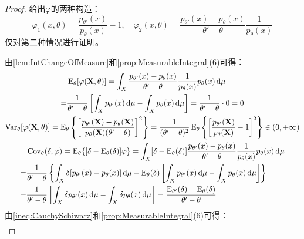\begin{proof}
	给出$\varphi$的两种构造：
	\begin{equation*}
		\varphi_1(x,\theta)=\frac{p_{\theta'}(x)}{p_{\theta}(x)}-1,\quad\varphi_2(x,\theta)=\frac{p_{\theta'}(x)-p_{\theta}(x)}{\theta'-\theta}\frac{1}{p_{\theta}(x)}
	\end{equation*}
	仅对第二种情况进行证明。\par
	由\cref{lem:IntChangeOfMeasure}和\cref{prop:MeasurableIntegral}(6)可得：
	\begin{gather*}
		\begin{aligned}
			&\operatorname{E}_{\theta}[\varphi(\mathbf{X},\theta)]=\int_{X}\frac{p_{\theta'}(x)-p_{\theta}(x)}{\theta'-\theta}\frac{1}{p_{\theta}(x)}p_{\theta}(x)\dif\mu \\
			=&\frac{1}{\theta'-\theta}\left[\int_{X}p_{\theta'}(x)\dif\mu-\int_{X}p_{\theta}(x)\dif\mu\right]=\frac{1}{\theta'-\theta}\cdot0=0
		\end{aligned} \\
		\begin{aligned}
			\operatorname{Var}_{\theta}[\varphi(\mathbf{X},\theta)]=\operatorname{E}_{\theta}\left\{\left[\frac{p_{\theta'}(\mathbf{X})-p_{\theta}(\mathbf{X})}{p_{\theta}(\mathbf{X})(\theta'-\theta)}\right]^2\right\}=\frac{1}{(\theta'-\theta)^2}\operatorname{E}_{\theta}\left\{\left[\frac{p_{\theta'}(\mathbf{X})}{p_{\theta}(\mathbf{X})}-1\right]^2\right\}\in(0,+\infty)
		\end{aligned} \\
		\begin{aligned}
			&\operatorname{Cov}_{\theta}(\delta,\varphi)=\operatorname{E}_{\theta}\{[\delta-\operatorname{E}_{\theta}(\delta)]\varphi\}=\int_{X}[\delta-\operatorname{E}_{\theta}(\delta)]\frac{p_{\theta'}(x)-p_{\theta}(x)}{\theta'-\theta}\frac{1}{p_{\theta}(x)}p_{\theta}(x)\dif\mu \\
			=&\frac{1}{\theta'-\theta}\left\{\int_{X}\delta[p_{\theta'}(x)-p_{\theta}(x)]\dif\mu-\operatorname{E}_{\theta}(\delta)\left[\int_{X}p_{\theta'}(x)\dif\mu-\int_{X}p_{\theta}(x)\dif\mu\right]\right\} \\
			=&\frac{1}{\theta'-\theta}\left[\int_{X}\delta p_{\theta'}(x)\dif\mu-\int_{X}\delta p_{\theta}(x)\dif\mu\right]=\frac{\operatorname{E}_{\theta'}(\delta)-\operatorname{E}_{\theta}(\delta)}{\theta'-\theta}
		\end{aligned}
	\end{gather*}
	由\cref{ineq:CauchySchiwarz}和\cref{prop:MeasurableIntegral}(6)可得：
	\begin{align*}

\end{align*}
\end{proof}
